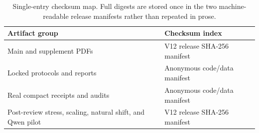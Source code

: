 \begin{table}[t]
\centering
\scriptsize
\setlength{\tabcolsep}{2.5pt}
\begin{tabular}{p{}p{}}
\hline
Artifact group & Checksum index \\
\hline
Main and supplement PDFs & V12 release SHA-256 manifest \\
Locked protocols and reports & Anonymous code/data manifest \\
Real compact receipts and audits & Anonymous code/data manifest \\
Post-review stress, scaling, natural shift, and Qwen pilot & V12 release SHA-256 manifest \\
\hline
\end{tabular}
\caption{Single-entry checksum map. Full digests are stored once in the two
machine-readable release manifests rather than repeated in prose.}
\label{supp:tab:checksum-map}
\end{table}
